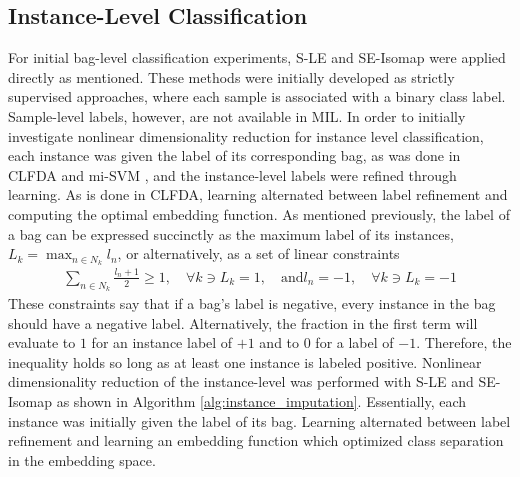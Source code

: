 \subsection{Instance-Level Classification}
For initial bag-level classification experiments, S-LE and SE-Isomap were applied directly as mentioned.  These methods were initially developed as strictly supervised approaches, where each sample is associated with a binary class label.  Sample-level labels, however, are not available in MIL.  In order to initially investigate nonlinear dimensionality reduction for instance level classification, each instance was given the label of its corresponding bag, as was done in CLFDA and mi-SVM \citep{Kim2010LocalDRMIL,Andrews2011MISVM}, and the instance-level labels were refined through learning.  As is done in CLFDA, learning alternated between label refinement and computing the optimal embedding function.  As mentioned previously, the  label of a bag can be expressed succinctly as the maximum label of its instances, $L_{k} = \max_{n \in N_{k}}l_{n}$, or alternatively, as a set of linear constraints
\begin{align}
	\sum_{n \in N_{k}} \frac{l_{n} + 1}{2} \geq 1, \quad \forall k \ni L_{k} = 1, \quad \text{and} l_{n} = -1, \quad \forall k \ni L_{k} = -1
\end{align}
\noindent
These constraints say that if a bag's label is negative, every instance in the bag should have a negative label.  Alternatively, the fraction in the first term will evaluate to $1$ for an instance label of $+1$ and to $0$ for a label of $-1$.  Therefore, the inequality holds so long as at least one instance is labeled positive.  Nonlinear dimensionality reduction of the instance-level was performed with S-LE and SE-Isomap as shown in Algorithm \ref{alg:instance_imputation}.  Essentially, each instance was initially given the label of its bag.  Learning alternated between label refinement and learning an embedding function which optimized class separation in the embedding space.

